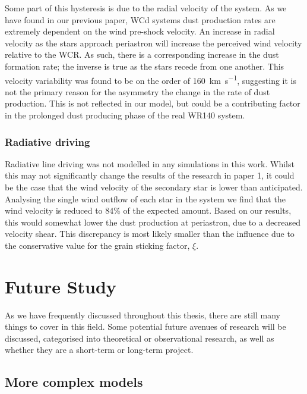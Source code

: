 Some part of this hysteresis is due to the radial velocity of the system.
As we have found in our previous paper, WCd systems dust production rates are extremely dependent on the wind pre-shock velocity.
An increase in radial velocity as the stars approach periastron will increase the perceived wind velocity relative to the WCR.
As such, there is a corresponding increase in the dust formation rate; the inverse is true as the stars recede from one another.
This velocity variability was found to be on the order of \SI{160}{km.s^{-1}}, suggesting it is not the primary reason for the asymmetry the change in the rate of dust production.
This is not reflected in our model, but could be a contributing factor in the prolonged dust producing phase of the real WR140 system.

\subsubsection{Radiative driving}

Radiative line driving was not modelled in any simulations in this work.
Whilst this may not significantly change the results of the research in paper 1, it could be the case that the wind velocity of the secondary star is lower than anticipated.
Analysing the single wind outflow of each star in the system we find that the wind velocity is reduced to 84\% of the expected amount.
Based on our results, this would somewhat lower the dust production at periastron, due to a decreased velocity shear.
This discrepancy is most likely smaller than the influence due to the conservative value for the grain sticking factor, $\xi$.

\section{Future Study}

As we have frequently discussed throughout this thesis, there are still many things to cover in this field.
Some potential future avenues of research will be discussed, categorised into theoretical or observational research, as well as whether they are a short-term or long-term project.

\subsection{More complex models}

